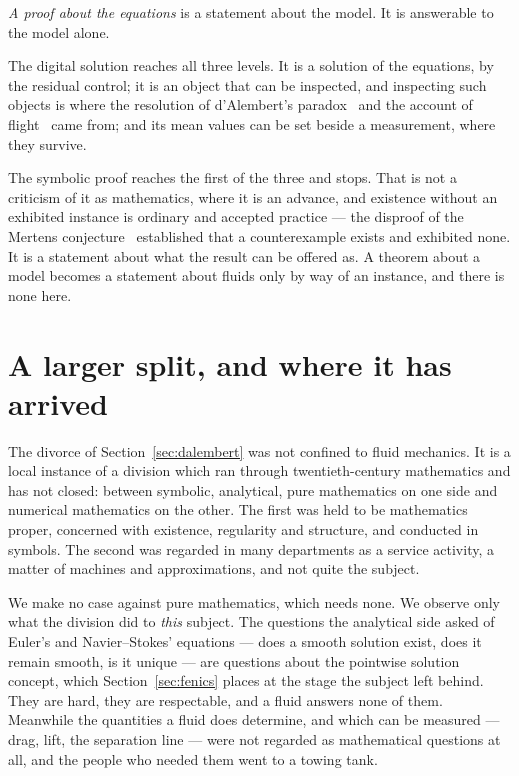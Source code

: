 \documentclass[11pt]{article}
\begin{document}
\emph{A proof about the equations} is a statement about the model. It is answerable to the model
alone.

The digital solution reaches all three levels. It is a solution of the equations, by the residual
control; it is an object that can be inspected, and inspecting such objects is where the resolution
of d'Alembert's paradox~\cite{dalembert} and the account of flight~\cite{flight} came from; and its
mean values can be set beside a measurement, where they survive.

The symbolic proof reaches the first of the three and stops. That is not a criticism of it as
mathematics, where it is an advance, and existence without an exhibited instance is ordinary and
accepted practice --- the disproof of the Mertens conjecture~\cite{mertens} established that a
counterexample exists and exhibited none. It is a statement about what the result can be offered as.
A theorem about a model becomes a statement about fluids only by way of an instance, and there is
none here.

\section{A larger split, and where it has arrived}\label{sec:split}

The divorce of Section~\ref{sec:dalembert} was not confined to fluid mechanics. It is a local
instance of a division which ran through twentieth-century mathematics and has not closed: between
symbolic, analytical, pure mathematics on one side and numerical mathematics on the other. The first
was held to be mathematics proper, concerned with existence, regularity and structure, and conducted
in symbols. The second was regarded in many departments as a service activity, a matter of machines
and approximations, and not quite the subject.

We make no case against pure mathematics, which needs none. We observe only what the division did to
\emph{this} subject. The questions the analytical side asked of Euler's and Navier--Stokes' equations
--- does a smooth solution exist, does it remain smooth, is it unique --- are questions about the
pointwise solution concept, which Section~\ref{sec:fenics} places at the stage the subject left
behind. They are hard, they are respectable, and a fluid answers none of them. Meanwhile the
quantities a fluid does determine, and which can be measured --- drag, lift, the separation line ---
were not regarded as mathematical questions at all, and the people who needed them went to a towing
tank.
\end{document}
